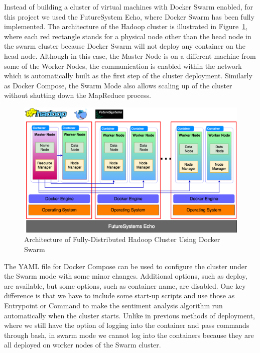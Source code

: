 Instead of building a cluster of virtual machines with Docker Swarm
enabled, for this project we used the FutureSystem Echo, where Docker
Swarm has been fully implemented. The architecture of the Hadoop
cluster is illustrated in Figure~\ref{f:hadoop-swarm}, where each red
rectangle stands for a physical node other than the head node in the
swarm cluster because Docker Swarm will not deploy any container on
the head node. Although in this case, the Master Node is on a
different machine from some of the Worker Nodes, the communication is
enabled within the network which is automatically built as the first
step of the cluster deployment.  Similarly as Docker Compose, the
Swarm Mode also allows scaling up of the cluster without shutting down
the MapReduce process.

\begin{figure}[!ht]
	\centering\includegraphics[width=\columnwidth]{images/hadoop-docker-swarm.png}
	\caption{Architecture of Fully-Distributed 
		Hadoop Cluster Using Docker Swarm}\label{f:hadoop-swarm}
\end{figure}

The YAML file for Docker Compose can be used to configure the cluster
under the Swarm mode with some minor changes. Additional options, such
as deploy, are available, but some options, such as container name,
are disabled.  One key difference is that we have to include some
start-up scripts and use those as Entrypoint or Command to make the
sentiment analysis algorithm run automatically when the cluster
starts. Unlike in previous methods of deployment, where we still have
the option of logging into the container and pass commands through
bash, in swarm mode we cannot log into the containers because they are
all deployed on worker nodes of the Swarm cluster.

